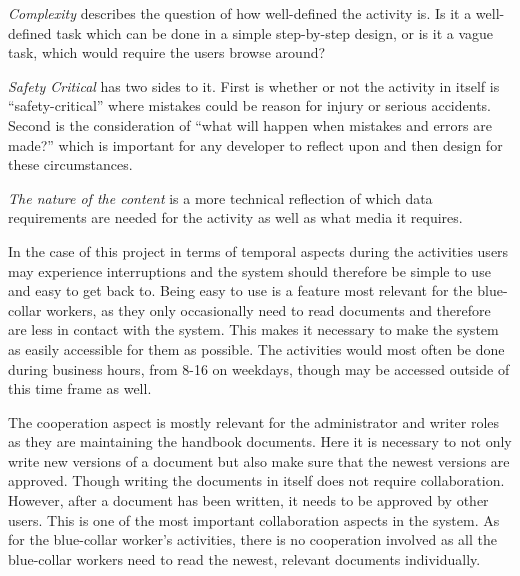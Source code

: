 \textit{Complexity} describes the question of how well-defined the activity is.
Is it a well-defined task which can be done in a simple step-by-step design, or is it a vague task, which would require the users browse around?

\textit{Safety Critical} has two sides to it.
First is whether or not the activity in itself is ``safety-critical'' where mistakes could be reason for injury or serious accidents.
Second is the consideration of ``what will happen when mistakes and errors are made?'' which is important for any developer to reflect upon and then design for these circumstances.

\textit{The nature of the content} is a more technical reflection of which data requirements are needed for the activity as well as what media it requires.

In the case of this project in terms of temporal aspects during the activities users may experience interruptions and the system should therefore be simple to use and easy to get back to.
Being easy to use is a feature most relevant for the blue-collar workers, as they only occasionally need to read documents and therefore are less in contact with the system.
This makes it necessary to make the system as easily accessible for them as possible.
The activities would most often be done during business hours, from 8-16 on weekdays, though may be accessed outside of this time frame as well.

The cooperation aspect is mostly relevant for the administrator and writer roles as they are maintaining the handbook documents.
Here it is necessary to not only write new versions of a document but also make sure that the newest versions are approved.
Though writing the documents in itself does not require collaboration.
However, after a document has been written, it needs to be approved by other users.
This is one of the most important collaboration aspects in the system.
As for the blue-collar worker's activities, there is no cooperation involved as all the blue-collar workers need to read the newest, relevant documents individually.

